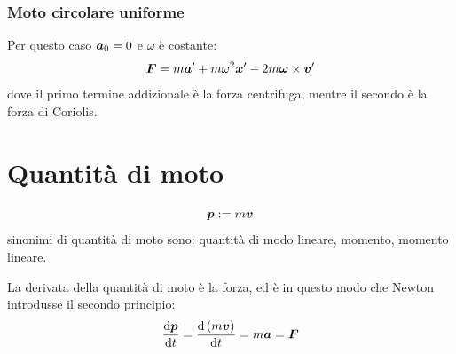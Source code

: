 \subsubsection{Moto circolare uniforme}
Per questo caso $\boldsymbol{a}_0=0$ e $\omega$ è costante:
\begin{equation}
  \boldsymbol{F} = m\boldsymbol{a}' + m\omega^2\boldsymbol{x}' - 2m\boldsymbol{\omega} \times\boldsymbol{v}'
\end{equation}
dove il primo termine addizionale è la forza centrifuga, mentre il secondo è la forza di Coriolis.

\section{Quantità di moto}
\begin{Def}
  \begin{equation}
    \boldsymbol{p}:=m\boldsymbol{v}
  \end{equation}
  sinonimi di quantità di moto sono: quantità di modo lineare, momento, momento lineare.
\end{Def}
La derivata della quantità di moto è la forza, ed è in questo modo che Newton introdusse il secondo principio:
\begin{equation}
\frac{\mathrm{d} \boldsymbol{p}}{\mathrm{d} t}=\frac{\mathrm{d}\left(m\boldsymbol{v}\right)}{\mathrm{d} t}=m\boldsymbol{a}=\boldsymbol{F}
\end{equation}
